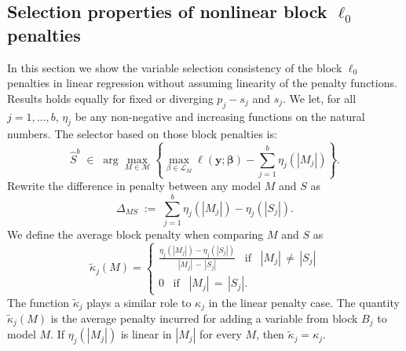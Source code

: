 \documentclass[bj,authoryear]{imsart}
\theoremstyle{plain}
\newcommand{\M}{\mathcal{M}}
\newcommand{\bs}{\boldsymbol}
\begin{document}
\subsection{Selection properties of nonlinear block $\ell_0$ penalties}

In this section we show the variable selection consistency of the block $\ell_0$ penalties in linear regression without assuming linearity of the penalty functions. Results holds equally for fixed or diverging $p_j-s_j$ and $s_j$. We let, for all $j=1,\ldots,b$, $\eta_j$ be any non-negative and increasing functions on the natural numbers. The selector based on those block penalties is:
\begin{equation}
  \hat S^b\;\in\;\arg\max_{M\in \M} \left\{\max_{\beta\in \mathcal{L}_M} \ell(\bs y;\bs \beta)-\sum_{j=1}^b\eta_j (|M_j|)\right\}.
\end{equation}
Rewrite the difference in penalty between any model $M$ and $S$ as
\begin{equation}\label{eq:DeltaMbis}
\Delta_{MS} \; := \; \sum_{j=1}^b \eta_j(|M_j|)-\eta_j(|S_j|).
\end{equation}
We define the average block penalty when comparing $M$ and $S$ as
\begin{equation}\label{eq:defkappatilde}
    \tilde{\kappa}_{j}(M)= \begin{cases}
     \frac{\eta_j(|M_j|)-\eta_j(|S_j|)}{|M_j|\,-\,|S_j|} \;\;\; \text{if}\;\;\; |M_j|\,\neq\,|S_j| \\
     0 \;\;\;\text{if}\;\;\; |M_j|\,=\,|S_j|.
 \end{cases}
\end{equation}
The function $\tilde{\kappa}_{j}$ plays a similar role to $\kappa_j$ in the linear penalty case. The quantity $\tilde{\kappa}_{j}(M)$ is the average penalty incurred for adding a variable from block $B_j$ to model $M$. If $\eta_j(|M_j|)$ is linear in $|M_j|$ for every $M$, then $\tilde{\kappa}_{j}= \kappa_j$.
\end{document}
